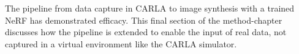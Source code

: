 \begin{comment}
Introduction
- Making NeRFs with real data is the usual way to go about generating NeRFs.
- The challenge is in capturing this data from cameras mounted on vehicles, in uncontrolled environment.

How do I expand the pipeline?
- How is the data captured? Introduce the NAPLab-car, the sensors, etc.
- How do I read this data? Mention the Aksel and Mathias' repository.
    - Use FFMPEG to read the .h264-video and serve the frames with a generator-function.
    - Use regex to parse a file with GPS data formatted as NMEA (National Marine Electronics Association) sentences, a standard messages used by GPS (Global Positioning System) receivers to communicate with other devices, such as computers or chartplotters. Each GPS-datapoint is seved with a generator-function the same way as with the video-frames.
    - The camera is synchronized to the closest frame in time to the GPS timestamp using custom code. "- Custom code is used to synchronize the camera to the frame closest in time with the GPS timestamp."
    - After synchronization, I can loop through the synchronized sensor data with a regular loop.
- Premise: Have synchronized image- and GPS-data.
- Create a NAPLabDataParser that implements the same methods as the CarlaDataParser. The main difference is in the implementation of the transform-function. 
- The transformation matrix is created by :
    - Store the initial GPS lat, long and alt, and use it as the reference point.
    - The reference point is utilized in order to convert latitude, longitude, altitude of subsequent GPS-readings to North, East, Down from the observer, i.e. the reference point.
    - NED is then converted to ENU and then to blender coordinate conventions.
    - The rotation is estimated with trigonometry by comparing subsequent GPS-readings.
    - The translation and rotation is combined into a transformation matrix.
- The intrinsics are computed in the same way as discussed in \autoref{sec:carla-to-nerfstudio}.
- The transformation matrix and intrinsics are combined into a transform.json
- The exported transform.json and images are in the same format as the output from the CarlaDataParser, so the following pipeline remains unchanged.
\end{comment}

The pipeline from data capture in CARLA to image synthesis with a trained NeRF has demonstrated efficacy. This final section of the method-chapter discusses how the pipeline is extended to enable the input of real data, not captured in a virtual environment like the CARLA simulator.

